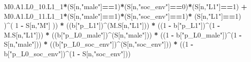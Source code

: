 \documentclass[
]{book}
\newenvironment{Shaded}{\begin{snugshade}}{\end{snugshade}}
\newcommand{\DecValTok}[1]{\textcolor[rgb]{0.00,0.00,0.81}{#1}}
\newcommand{\NormalTok}[1]{#1}
\newcommand{\SpecialCharTok}[1]{\textcolor[rgb]{0.81,0.36,0.00}{\textbf{#1}}}
\newcommand{\StringTok}[1]{\textcolor[rgb]{0.31,0.60,0.02}{#1}}
\begin{document}
\begin{Shaded}
\begin{Highlighting}[]
\NormalTok{          M0.A1.L0\_10.L1\_1}\SpecialCharTok{*}\NormalTok{(S[n,}\StringTok{"male"}\NormalTok{]}\SpecialCharTok{==}\DecValTok{1}\NormalTok{)}\SpecialCharTok{*}\NormalTok{(S[n,}\StringTok{"soc\_env"}\NormalTok{]}\SpecialCharTok{==}\DecValTok{0}\NormalTok{)}\SpecialCharTok{*}\NormalTok{(S[n,}\StringTok{"L1"}\NormalTok{]}\SpecialCharTok{==}\DecValTok{1}\NormalTok{) }\SpecialCharTok{+}
\NormalTok{          M0.A1.L0\_11.L1\_1}\SpecialCharTok{*}\NormalTok{(S[n,}\StringTok{"male"}\NormalTok{]}\SpecialCharTok{==}\DecValTok{1}\NormalTok{)}\SpecialCharTok{*}\NormalTok{(S[n,}\StringTok{"soc\_env"}\NormalTok{]}\SpecialCharTok{==}\DecValTok{1}\NormalTok{)}\SpecialCharTok{*}
\NormalTok{          (S[n,}\StringTok{"L1"}\NormalTok{]}\SpecialCharTok{==}\DecValTok{1}\NormalTok{) )}\SpecialCharTok{\^{}}\NormalTok{( }\DecValTok{1} \SpecialCharTok{{-}}\NormalTok{ S[n,}\StringTok{"M"}\NormalTok{] )) }\SpecialCharTok{*}
\NormalTok{      ((b[}\StringTok{"p\_L1"}\NormalTok{])}\SpecialCharTok{\^{}}\NormalTok{(M.S[n,}\StringTok{"L1"}\NormalTok{])) }\SpecialCharTok{*}
\NormalTok{      ((}\DecValTok{1} \SpecialCharTok{{-}}\NormalTok{ b[}\StringTok{"p\_L1"}\NormalTok{])}\SpecialCharTok{\^{}}\NormalTok{(}\DecValTok{1} \SpecialCharTok{{-}}\NormalTok{ M.S[n,}\StringTok{"L1"}\NormalTok{])) }\SpecialCharTok{*}
\NormalTok{      ((b[}\StringTok{"p\_L0\_male"}\NormalTok{])}\SpecialCharTok{\^{}}\NormalTok{(S[n,}\StringTok{"male"}\NormalTok{])) }\SpecialCharTok{*} 
\NormalTok{      ((}\DecValTok{1} \SpecialCharTok{{-}}\NormalTok{ b[}\StringTok{"p\_L0\_male"}\NormalTok{])}\SpecialCharTok{\^{}}\NormalTok{(}\DecValTok{1} \SpecialCharTok{{-}}\NormalTok{ S[n,}\StringTok{"male"}\NormalTok{])) }\SpecialCharTok{*} 
\NormalTok{      ((b[}\StringTok{"p\_L0\_soc\_env"}\NormalTok{])}\SpecialCharTok{\^{}}\NormalTok{(S[n,}\StringTok{"soc\_env"}\NormalTok{])) }\SpecialCharTok{*}
\NormalTok{      ((}\DecValTok{1} \SpecialCharTok{{-}}\NormalTok{ b[}\StringTok{"p\_L0\_soc\_env"}\NormalTok{])}\SpecialCharTok{\^{}}\NormalTok{(}\DecValTok{1} \SpecialCharTok{{-}}\NormalTok{ S[n,}\StringTok{"soc\_env"}\NormalTok{])) }
    

\end{Highlighting}
\end{Shaded}
\end{document}
